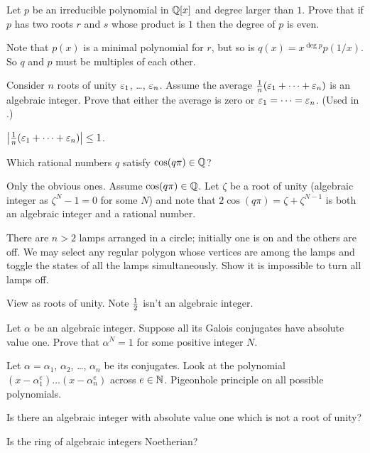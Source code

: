 \begin{problem}
	[Brazil 2006]
	\gim
	Let $p$ be an irreducible polynomial in $\mathbb Q[x]$
	and degree larger than $1$.
	Prove that if $p$ has two roots $r$ and $s$ whose product is $1$
	then the degree of $p$ is even.
	\begin{hint}
		Note that $p(x)$ is a minimal polynomial for $r$,
		but so is $q(x) = x^{\deg p} p(1/x)$.
		So $q$ and $p$ must be multiples of each other.
	\end{hint}
\end{problem}

\begin{sproblem}
	\label{prob:rep_lemma}
	Consider $n$ roots of unity $\varepsilon_1$, \dots, $\varepsilon_n$.
	Assume the average $\frac1n(\varepsilon_1 + \dots + \varepsilon_n)$ is an algebraic integer.
	Prove that either the average is zero or $\varepsilon_1 = \dots = \varepsilon_n$.
	(Used in .)
	\begin{hint}
		$\left\lvert \frac 1n(\varepsilon_1 + \dots + \varepsilon_n) \right\rvert \le 1$.
	\end{hint}
\end{sproblem}

\begin{dproblem}
	\gim
	Which rational numbers $q$ satisfy $\cos(q\pi) \in \mathbb Q$?
	\begin{hint}
		Only the obvious ones.
		Assume $\cos(q\pi) \in \mathbb Q$.
		Let $\zeta$ be a root of unity (algebraic integer
		as $\zeta^N-1 = 0$ for some $N$)
		and note that $2\cos(q\pi) = \zeta + \zeta^{N-1}$
		is both an algebraic integer and a rational number.
	\end{hint}
\end{dproblem}

\begin{problem}
	[MOP 2010]
	There are $n > 2$ lamps arranged in a circle;
	initially one is on and the others are off.
	We may select any regular polygon whose vertices are among the lamps
	and toggle the states of all the lamps simultaneously.
	Show it is impossible to turn all lamps off.
	\begin{hint}
		View as roots of unity. Note $\frac{1}{2}$ isn't an algebraic integer.
	\end{hint}
\end{problem}

\begin{problem}
	\yod
	Let $\alpha$ be an algebraic integer.
	Suppose all its Galois conjugates have absolute value one.
	Prove that $\alpha^N=1$ for some positive integer $N$.
	\begin{hint}
		Let $\alpha = \alpha_1$, $\alpha_2$, \dots, $\alpha_n$ be its conjugates.
		Look at the polynomial $(x-\alpha_1^e) \dots (x-\alpha_n^e)$ across $e \in \mathbb N$.
		Pigeonhole principle on all possible polynomials.
	\end{hint}
\end{problem}

\begin{problem}
	\yod
	Is there an algebraic integer with absolute value one
	which is not a root of unity?
\end{problem}

\begin{problem}
	Is the ring of algebraic integers Noetherian?
\end{problem}
